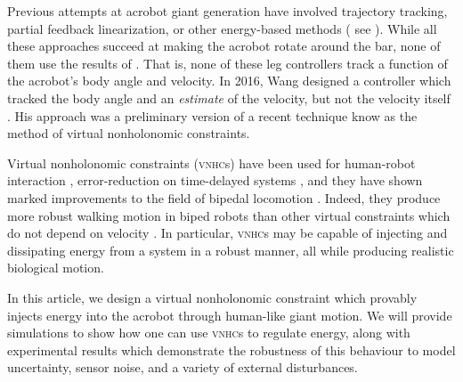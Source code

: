 \documentclass[journal,twoside,web, twocolumn,draftcls]{ieeecolor}
\newcommand*{\vnhc}{\textsc{vnhc}\xspace}
\newcommand*{\vnhcs}{\textsc{vnhc}s\xspace}
\begin{document}
Previous attempts at acrobot giant generation have involved
trajectory tracking, partial feedback linearization, or other energy-based
methods
( see
\cite{energy_pumping_robotic_swinging,swingup_giant_acrobot,dynamical_servo_acrobot_vc,control_giant_two_link_gymnastic_robot}
).
While all these approaches succeed at making the acrobot rotate around the
bar, none of them use the results of \cite{pendulum_length_giant_gymnastics}.
That is, none of these leg controllers track a function of the acrobot's body
angle and velocity.
In 2016, Wang designed a controller which tracked the
body angle and an \textit{estimate} of the velocity, but not the velocity itself
\cite{xingbo_thesis}.
His approach was a preliminary version of a recent technique know as the method
of virtual nonholonomic constraints.

Virtual nonholonomic constraints (\vnhcs) have been used for human-robot interaction
\cite{vnhc_human_robot_cooperation,psd_based_vnhc_redundant_manipulator,haptic_vnhc},
error-reduction on time-delayed systems \cite{vnhc_time_delay_teleop},
and they have shown marked improvements to the field of bipedal locomotion 
\cite{nhvc_dynamic_walking,
hybrid_zero_dynamics_bipedal_nhvcs,output_nhvc_bipedal_control}.
Indeed, they produce more robust walking motion in biped robots than
other virtual constraints which do not depend on velocity
\cite{nhvc_incline_walking}.
In particular, \vnhcs may be capable of injecting and
dissipating energy from a system in a robust manner, all while producing
realistic biological motion. 

In this article, we design a virtual nonholonomic constraint which provably
injects energy into the acrobot through human-like giant motion.
We will provide simulations to show how one can use \vnhcs to regulate energy,
along with experimental results which demonstrate the robustness of this
behaviour to model uncertainty, sensor noise, and a variety of external
disturbances. 
\end{document}
